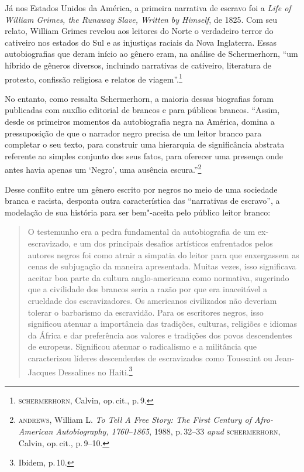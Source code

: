 Já nos Estados Unidos da América, a primeira narrativa de escravo foi a \emph{Life of William Grimes, the Runaway Slave, Written by Himself}, de 1825.
Com seu relato, William Grimes revelou aos leitores do Norte o verdadeiro terror do cativeiro nos estados do Sul e as injustiças raciais da Nova Inglaterra.
Essas autobiografias que deram início ao gênero eram, na análise de Schermerhorn, 
``um híbrido de gêneros diversos, incluindo narrativas de cativeiro, literatura de protesto, confissão religiosa e relatos de viagem''.\footnote{\textsc{schermerhorn}, Calvin, op.\,cit., p.\,9.}

No entanto, como ressalta Schermerhorn, a maioria dessas biografias foram publicadas com auxílio editorial de brancos e para públicos brancos.  “Assim, desde os primeiros momentos da autobiografia negra na América, domina a pressuposição de que o narrador negro precisa de um leitor branco para completar o seu texto, para construir uma
hierarquia de significância abstrata referente ao simples
conjunto dos seus fatos, para oferecer uma presença onde
antes havia apenas um `Negro', uma ausência escura.”\footnote{\textsc{andrews}, William L. \textit{To Tell A Free Story: The First Century of Afro-American Autobiography, 1760–1865}, 1988, p.\,32--33 \textit{apud} \textsc{schermerhorn}, Calvin, op.\,cit., p.\,9--10.}

Desse conflito entre um gênero escrito por negros no meio de uma sociedade branca e racista, desponta outra característica das ``narrativas de escravo'', a modelação de sua história para ser bem"-aceita pelo público leitor branco:

\begin{quote}
O testemunho era a pedra fundamental da autobiografia de um ex-escravizado, e um dos principais desafios artísticos enfrentados pelos autores negros foi como atrair a
simpatia do leitor para que enxergassem as cenas de subjugação da maneira apresentada. Muitas vezes, isso significava aceitar boa parte da cultura anglo-americana como
normativa, sugerindo que a civilidade dos brancos seria a
razão por que era inaceitável a crueldade dos escravizadores. Os americanos civilizados não deveriam tolerar o barbarismo da escravidão. Para os escritores negros, isso
significou atenuar a importância das tradições, culturas, religiões e idiomas da África e dar preferência aos valores e tradições dos povos descendentes de europeus. Significou atenuar o radicalismo e a militância que caracterizou líderes descendentes de escravizados como Toussaint ou Jean-Jacques Dessalines no Haiti.\footnote{Ibidem, p.\,10.}
\end{quote}

